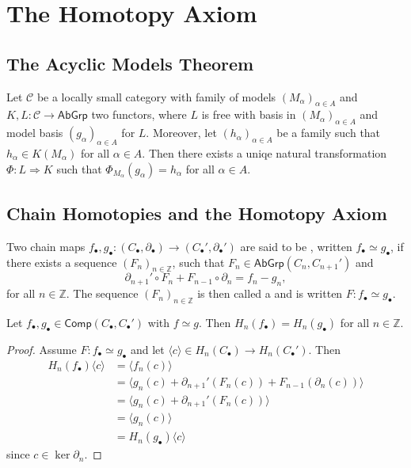 \section*{The Homotopy Axiom}
\subsection*{The Acyclic Models Theorem}

\begin{proposition}
	Let $\mathcal{C}$ be a locally small category with family of models $(M_\alpha)_{\alpha \in A}$ and $K,L : \mathcal{C} \to \mathsf{AbGrp}$ two functors, where $L$ is free with basis in $(M_\alpha)_{\alpha \in A}$ and model basis $(g_\alpha)_{\alpha \in A}$ for $L$. Moreover, let $(h_\alpha)_{\alpha \in A}$ be a family such that $h_\alpha \in K(M_\alpha)$ for all $\alpha \in A$. Then there exists a uniqe natural transformation $\Phi : L \Rightarrow K$ such that $\Phi_{M_\alpha}(g_\alpha) = h_\alpha$ for all $\alpha \in A$.
\end{proposition}



\subsection*{Chain Homotopies and the Homotopy Axiom}
\begin{definition}
	Two chain maps $f_\bullet,g_\bullet : (C_\bullet,\partial_\bullet) \to (C_\bullet',\partial_\bullet')$ are said to be , written $f_\bullet \simeq g_\bullet$, if there exists a sequence $(F_n)_{n \in \mathbb{Z}}$, such that $F_n \in \mathsf{AbGrp}(C_n,C_{n + 1}')$ and 
	\begin{equation*}
		\partial_{n + 1}' \circ F_n + F_{n - 1} \circ \partial_n = f_n - g_n,
	\end{equation*}
	\noindent for all $n \in \mathbb{Z}$. The sequence $(F_n)_{n \in \mathbb{Z}}$ is then called a  and is written $F : f_\bullet \simeq g_\bullet$.
\end{definition}

\begin{proposition}
	\label{prop:inclusions}
	Let $f_\bullet,g_\bullet \in \mathsf{Comp}(C_\bullet,C_\bullet')$ with $f \simeq g$. Then $H_n(f_\bullet) = H_n(g_\bullet)$ for all $n \in \mathbb{Z}$.
\end{proposition}

\begin{proof}
	Assume $F : f_\bullet \simeq g_\bullet$ and let $\langle c \rangle \in H_n(C_\bullet) \to H_n(C_\bullet')$. Then
	\begin{align*}
		H_n(f_\bullet)\langle c \rangle &= \langle f_n(c) \rangle\\
		&= \langle g_n(c) + \partial_{n + 1}'(F_n(c)) + F_{n - 1}(\partial_n(c)) \rangle\\
		&= \langle g_n(c) + \partial_{n + 1}'(F_n(c)) \rangle\\
		&= \langle g_n(c) \rangle\\
		&= H_n(g_\bullet)\langle c \rangle
	\end{align*}
	\noindent since $c \in \ker \partial_n$.
\end{proof}

